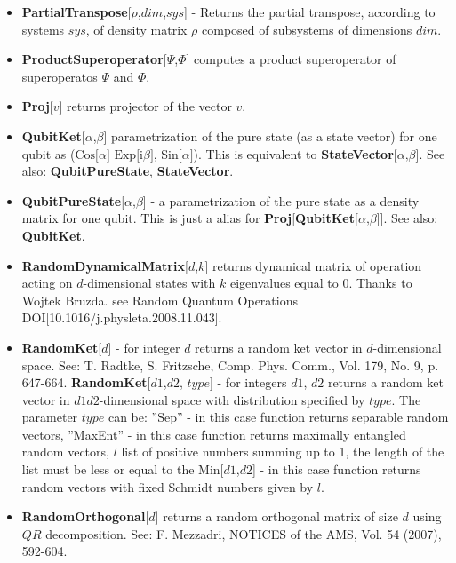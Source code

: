 \documentclass[a4paper,10pt]{scrartcl}
\begin{document}
\begin{itemize}
\item  \textbf{PartialTranspose}[$\rho$,$dim$,$sys$] - Returns the partial transpose, according to systems $sys$, of density matrix $\rho$ composed of subsystems of dimensions $dim$.
\item  \textbf{ProductSuperoperator}[$\Psi$,$\Phi$] computes a product superoperator of superoperatos $\Psi$ and $\Phi$.
\item  \textbf{Proj}[$v$] returns projector of the vector $v$.
\item  \textbf{QubitKet}[$\alpha$,$\beta$] parametrization of the pure state (as a state vector) for one qubit as ($\text{Cos[$\alpha $] Exp[i$\beta $], Sin[$\alpha $]}$). This is equivalent to \textbf{StateVector}[{$\text{$\alpha $,$\beta $}$}]. See also: \textbf{QubitPureState}, \textbf{StateVector}.
\item  \textbf{QubitPureState}[$\text{$\alpha $,$\beta $}$] - a parametrization of the pure state as a density matrix for one qubit. This is just a alias for \textbf{Proj}[\textbf{QubitKet}[$\text{$\alpha $,$\beta $}$]]. See also: \textbf{QubitKet}.
\item  \textbf{RandomDynamicalMatrix}[$d$,$k$] returns dynamical matrix of operation acting on $d$-dimensional states with $k$ eigenvalues equal to 0. Thanks to Wojtek Bruzda. see Random Quantum Operations DOI[10.1016/j.physleta.2008.11.043].
\item  \textbf{RandomKet}[$d$] - for integer $d$ returns a random ket vector in $d$-dimensional space. See: T. Radtke, S. Fritzsche, Comp. Phys. Comm., Vol. 179, No. 9, p. 647-664. \newline{}
\textbf{RandomKet}[{$d1$,$d2$}, $type$] - for integers $d1$, $d2$ returns a random ket vector in $d1 d2$-dimensional space with distribution specified by $type$. \newline{}
The parameter $type$ can be:\newline{}
\indent{} ''Sep'' - in this case function returns separable random vectors,\newline{}
\indent{} ''MaxEnt'' - in this case function returns maximally entangled random vectors,\newline{}
\indent{} $l$ list of positive numbers summing up to 1, the length of the list must be less or equal to the Min[$d1$,$d2$] - in this case function returns random vectors with fixed Schmidt numbers given by $l$.
\item  \textbf{RandomOrthogonal}[$d$] returns a random orthogonal matrix of size $d$ using $QR$ decomposition. See: F. Mezzadri, NOTICES of the AMS, Vol. 54 (2007), 592-604.

\end{itemize}
\end{document}

